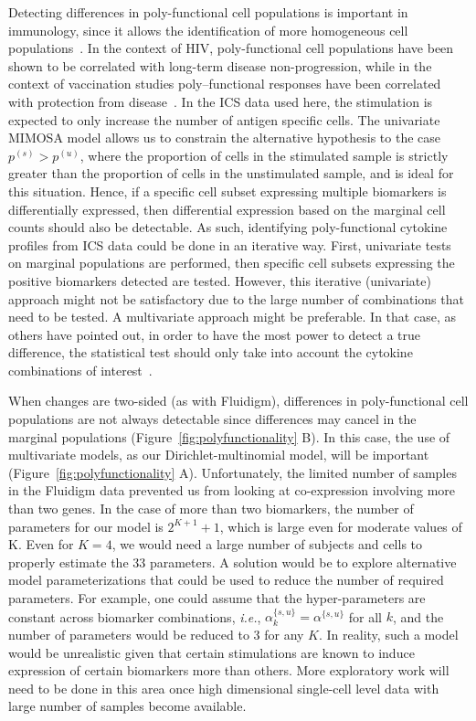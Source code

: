 \documentclass[12pt,oupdraft]{biostatistics}
\begin{document}
Detecting differences in poly-functional cell populations is important in immunology, since it allows the identification of more homogeneous cell populations~\citep{Milush:2009bz}.
In the context of HIV, poly-functional cell populations have been shown to be correlated with long-term disease non-progression, while in the context of vaccination studies poly--functional responses have been correlated with protection from disease~\citep[][e.g.]{Betts:2006dw,Precopio:2007ht}.
In the ICS data used here, the stimulation is expected to only increase the number of antigen specific cells. The univariate MIMOSA model allows us to constrain the alternative hypothesis to the case $p^{(s)} > p^{(u)}$, where the proportion of cells in the stimulated sample is strictly greater than the proportion of cells in the unstimulated sample, and is ideal for this situation.
Hence, if a specific cell subset expressing multiple biomarkers is differentially expressed, then differential expression based on the marginal cell counts should also be detectable.
As such, identifying poly-functional cytokine profiles from ICS data could be done in an iterative way.
First, univariate tests on marginal populations are performed, then specific cell subsets expressing the positive biomarkers detected are tested.
However, this iterative (univariate) approach might not be satisfactory due to the large number of combinations that need to be tested. A multivariate approach might be preferable.
In that case,  as others have pointed out, in order to have the most power to detect a true difference, the statistical test should only take into account the cytokine combinations of interest~\citep{Nason:2006dx}.

When changes are two-sided (as with Fluidigm), differences in poly-functional cell populations are not always detectable  since differences may cancel in the marginal populations (Figure~\ref{fig:polyfunctionality} B).
In this case, the use of multivariate models, as our Dirichlet-multinomial model, will be important (Figure~\ref{fig:polyfunctionality} A).
Unfortunately, the limited number of samples in the Fluidigm data prevented us from looking at co-expression involving more than two genes.
In the case of more than two biomarkers, the number of parameters for our model is $2^{K+1}+1$, which is large even for moderate values of K. Even for  $K=4$, we would need a large number of subjects and cells to properly estimate the 33 parameters. A solution would be to explore alternative model parameterizations that could be used to reduce the number of required parameters.
For example, one could assume that the hyper-parameters are constant across biomarker combinations, \textit{i.e.}, $\alpha^{\{s,u\}}_{k}=\alpha^{\{s,u\}}$ for all $k$, and the number of parameters would be reduced to $3$ for any $K$.
In reality, such a model would be unrealistic given that certain stimulations are known to induce expression of certain biomarkers more than others.
More exploratory work will need to be done in this area once high dimensional single-cell level data with large number of samples become available.
\end{document}
